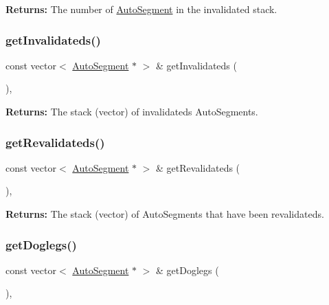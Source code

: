 {\bfseries Returns\+:} The number of \mbox{\hyperlink{classKatabatic_1_1AutoSegment}{Auto\+Segment}} in the invalidated stack. \mbox{\label{classKatabatic_1_1Session_a6060b7e972f3c0d10cfa158b5ed174e6}} 
\subsubsection{\texorpdfstring{get\+Invalidateds()}{getInvalidateds()}}
{\footnotesize\ttfamily const vector$<$ \mbox{\hyperlink{classKatabatic_1_1AutoSegment}{Auto\+Segment}} $\ast$ $>$ \& get\+Invalidateds (\begin{DoxyParamCaption}{ }\end{DoxyParamCaption})\hspace{0.3cm}{\ttfamily [inline]}, {\ttfamily [static]}}

{\bfseries Returns\+:} The stack (vector) of invalidateds Auto\+Segments. \mbox{\label{classKatabatic_1_1Session_af5675d50557db83d11b7d2151de5f34c}} 
\subsubsection{\texorpdfstring{get\+Revalidateds()}{getRevalidateds()}}
{\footnotesize\ttfamily const vector$<$ \mbox{\hyperlink{classKatabatic_1_1AutoSegment}{Auto\+Segment}} $\ast$ $>$ \& get\+Revalidateds (\begin{DoxyParamCaption}{ }\end{DoxyParamCaption})\hspace{0.3cm}{\ttfamily [inline]}, {\ttfamily [static]}}

{\bfseries Returns\+:} The stack (vector) of Auto\+Segments that have been revalidateds. \mbox{\label{classKatabatic_1_1Session_a84211b77fe7fb8b49a93d7f298a5de90}} 
\subsubsection{\texorpdfstring{get\+Doglegs()}{getDoglegs()}}
{\footnotesize\ttfamily const vector$<$ \mbox{\hyperlink{classKatabatic_1_1AutoSegment}{Auto\+Segment}} $\ast$ $>$ \& get\+Doglegs (\begin{DoxyParamCaption}{ }\end{DoxyParamCaption})\hspace{0.3cm}{\ttfamily [inline]}, {\ttfamily [static]}}

